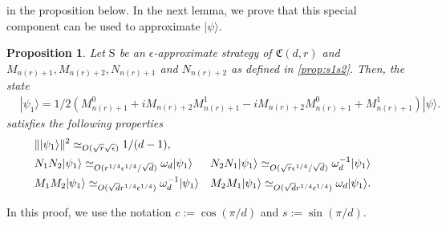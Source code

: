 \documentclass[11pt,letterpaper]{article}
\newcommand{\ket}[1]{|#1\rangle}
\newcommand{\braket}[2]{\langle#1|#2\rangle}
\DeclarePairedDelimiter{\norm}{\lVert}{\rVert}
\newcommand{\1}{\mathbb{1}}
\newcommand{\nr}{n(r)}
\newcommand{\fC}{\mathfrak{C}}
\newcommand{\bS}{\mathrm{S}}
\newcommand{\ep}{\epsilon}
\newcommand{\se}{\sqrt{\epsilon}}
\newcommand{\qe}{\epsilon^{1/4}}
\newcommand{\sd}{\sqrt{d}}
\newcommand{\sr}{\sqrt{r}}
\newcommand{\qr}{r^{1/4}}
\newcommand{\appd}[1]{\simeq_{#1}}
\newtheorem{proposition}[theorem]{Proposition}
\theoremstyle{definition}
\begin{document}
in the proposition below. In the next lemma, we prove that this special component can be used to approximate $\ket{\psi}$. 
\begin{proposition}
    \label{prop:psi1}
	Let $\bS$ be an $\ep$-approximate strategy of $\fC(d,r)$ and $M_{\nr+1}, M_{\nr+2},N_{\nr+1}$ and $N_{\nr+2}$ as defined in \cref{prop:s1s2}.
	Then, the state
	\begin{align}
		&\ket{\psi_1} =1/2(M_{\nr+1}^0 + iM_{\nr+2}M_{\nr+1}^1 - iM_{\nr+2}M_{\nr+1}^0 +M_{\nr+1}^1) \ket{\psi}.
	\end{align}
	satisfies the following properties
	\begin{align}
	 \label{eq:psi1_norm} &\norm{\ket{\psi_1}}^2 \appd{O(\sr\se)} 1/(d-1),\\
	 \label{eq:psi1_eig1} &N_1N_2 \ket{\psi_1} \appd{O(\qr \qe/\sd)} \omega_d\ket{\psi_1} 
	 && N_2N_1 \ket{\psi_1} \appd{O(\sr \qe/\sd)} \omega_d^{-1} \ket{\psi_1} \\
	 \label{eq:psi1_eig2} &M_1M_2 \ket{\psi_1} \appd{O(\sd\qr \qe)} \omega_d^{-1} \ket{\psi_1}
	 && M_2M_1 \ket{\psi_1} \appd{O(\sd\qr \qe)} \omega_d \ket{\psi_1}.
	\end{align}
\end{proposition}
In this proof, we use the notation $c := \cos(\pi/d)$ and $s := \sin(\pi/d)$.
\end{document}
